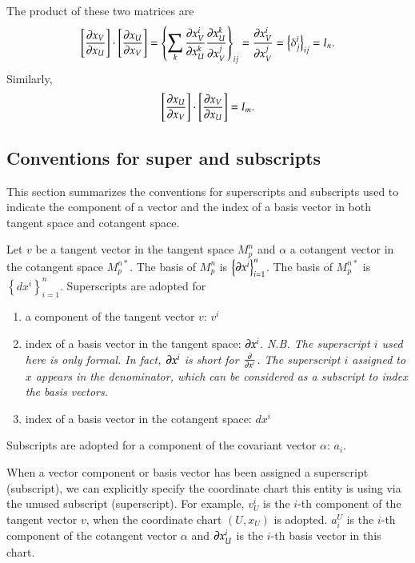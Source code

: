 \documentclass[11pt, a4paper]{book}
\begin{document}
The product of these two matrices are
\begin{equation}
  \left[ \frac{\partial x_V}{\partial x_U} \right] \cdot \left[ \frac{\partial x_U}{\partial x_V}
  \right] = \left\{ \sum_k \frac{\partial x_V^i}{\partial x_U^k} \frac{\partial x_U^k}{\partial
      x_V^j} \right\}_{ij} = \frac{\partial x_V^i}{\partial x_V^j} = \left\{ \delta^i_j
  \right\}_{ij} = I_n.
\end{equation}
Similarly,
\begin{equation}
  \left[ \frac{\partial x_U}{\partial x_V} \right] \cdot \left[ \frac{\partial x_V}{\partial x_U} \right] = I_m.
\end{equation}

\subsection{Conventions for super and subscripts}

This section summarizes the conventions for superscripts and subscripts used to indicate
the component of a vector and the index of a basis vector in both tangent space and
cotangent space.

Let $v$ be a tangent vector in the tangent space $M_p^n$ and $\alpha$ a cotangent vector
in the cotangent space $M_p^{n*}$. The basis of $M_p^n$ is
$\left\{ \boldsymbol{\partial}x^i \right\}_{i=1}^n$. The basis of $M_p^{n*}$ is
$\left\{ dx^i \right\}_{i=1}^n$. Superscripts are adopted for
\begin{enumerate}
\item a component of the tangent vector $v$: $v^i$
\item index of a basis vector in the tangent space: $\boldsymbol{\partial}x^i$. \emph{N.B. The
    superscript $i$ used here is only formal. In fact, $\boldsymbol{\partial}x^i$ is short for
    $\frac{\partial}{\partial x^i}$. The superscript $i$ assigned to $x$ appears in the
    denominator, which can be considered as a subscript to index the basis vectors.}
\item index of a basis vector in the cotangent space: $dx^i$
\end{enumerate}
Subscripts are adopted for a component of the covariant vector $\alpha$: $a_i$.

When a vector component or basis vector has been assigned a superscript (subscript), we
can explicitly specify the coordinate chart this entity is using via the unused subscript
(superscript). For example, $v_U^{i}$ is the $i$-th component of the tangent vector $v$,
when the coordinate chart $(U,x_U)$ is adopted. $a_i^U$ is the $i$-th component of the
cotangent vector $\alpha$ and $\boldsymbol{\partial}x_U^i$ is the $i$-th basis vector in this
chart.
\end{document}
